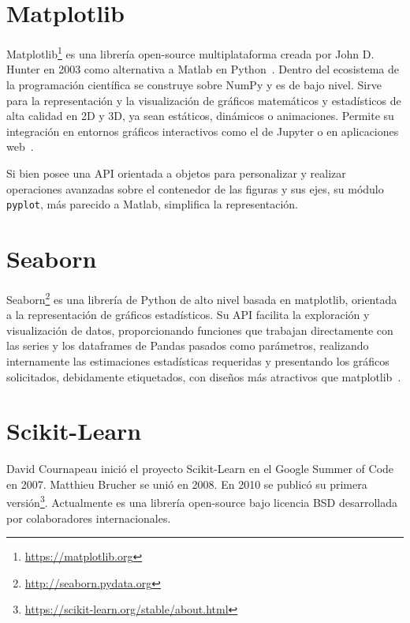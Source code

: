 \documentclass[a4paper, 12pt]{book}
\begin{document}
\section{Matplotlib} 
\label{sec:matplotlib}

Matplotlib\footnote{\url{https://matplotlib.org}} es una librería open-source multiplataforma creada por John D. Hunter en 2003 como alternativa a Matlab en Python~\cite{Hunter2007}. Dentro del ecosistema de la programación científica se construye sobre NumPy y es de bajo nivel.
Sirve para la representación y la visualización de gráficos matemáticos y estadísticos de alta calidad en 2D y 3D, ya sean estáticos, dinámicos o animaciones. Permite su integración en entornos gráficos interactivos como el de Jupyter o en aplicaciones web~\cite{VanderplasJake2017Pdsh}.

Si bien posee una API orientada a objetos para personalizar y realizar operaciones avanzadas sobre el contenedor de las figuras y sus ejes, su módulo \texttt{pyplot}, más parecido a Matlab, simplifica la representación. 

\section{Seaborn} 
\label{sec:seaborn}

Seaborn\footnote{\url{http://seaborn.pydata.org}} es una librería de Python de alto nivel basada en matplotlib, orientada a la representación de gráficos estadísticos. Su API facilita la exploración y visualización de datos, proporcionando funciones que trabajan directamente con las series y los dataframes de Pandas pasados como parámetros, realizando internamente las estimaciones estadísticas requeridas y presentando los gráficos solicitados, debidamente etiquetados, con diseños más atractivos que matplotlib~\cite{waskom2021seaborn}.

\section{Scikit-Learn} 
\label{sec:sklearn}

David Cournapeau inició el proyecto Scikit-Learn en el Google Summer of Code en 2007. Matthieu Brucher se unió en 2008. En 2010 se publicó su primera versión\footnote{\url{https://scikit-learn.org/stable/about.html}}. Actualmente es una librería open-source bajo licencia BSD desarrollada por colaboradores internacionales.%
\end{document}
